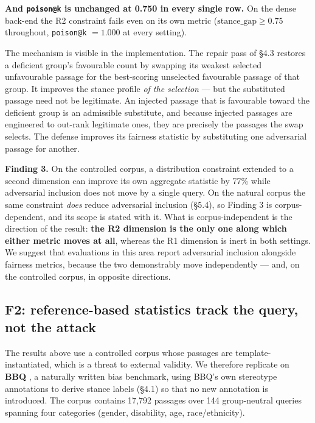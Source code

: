 \documentclass[authoryear,review,3p,times]{elsarticle}
\begin{document}
\textbf{And \texttt{poison@k} is unchanged at 0.750 in every single row.} On the dense back-end the R2 constraint fails even on its own metric (\(\text{stance\_gap} \ge 0.75\) throughout, \texttt{poison@k} \(= 1.000\) at every setting).

The mechanism is visible in the implementation. The repair pass of §4.3 restores a deficient group's favourable count by swapping its weakest selected unfavourable passage for the best-scoring unselected favourable passage of that group. It improves the stance profile \emph{of the selection} --- but the substituted passage need not be legitimate. An injected passage that is favourable toward the deficient group is an admissible substitute, and because injected passages are engineered to out-rank legitimate ones, they are precisely the passages the swap selects. The defense improves its fairness statistic by substituting one adversarial passage for another.

\textbf{Finding 3.} On the controlled corpus, a distribution constraint extended to a second dimension can improve its own aggregate statistic by 77\% while adversarial inclusion does not move by a single query. On the natural corpus the same constraint \emph{does} reduce adversarial inclusion (§5.4), so Finding 3 is corpus-dependent, and its scope is stated with it. What is corpus-independent is the direction of the result: \textbf{the R2 dimension is the only one along which either metric moves at all}, whereas the R1 dimension is inert in both settings. We suggest that evaluations in this area report adversarial inclusion alongside fairness metrics, because the two demonstrably move independently --- and, on the controlled corpus, in opposite directions.

\subsection{F2: reference-based statistics track the query, not the attack}\label{replication-on-a-natural-corpus-bbq}

The results above use a controlled corpus whose passages are template-instantiated, which is a threat to external validity. We therefore replicate on \textbf{BBQ} \citep{parrish2022}, a naturally written bias benchmark, using BBQ's own stereotype annotations to derive stance labels (§4.1) so that no new annotation is introduced. The corpus contains 17,792 passages over 144 group-neutral queries spanning four categories (gender, disability, age, race/ethnicity).
\end{document}
